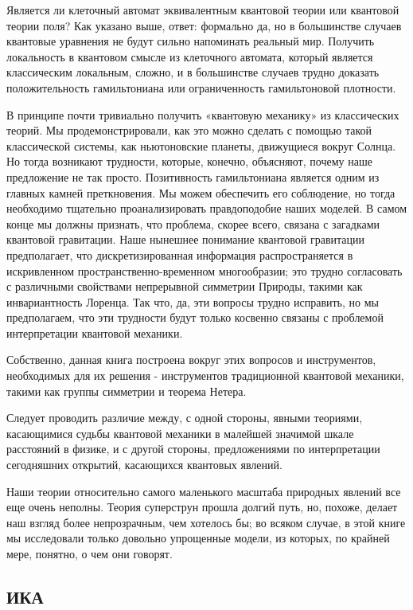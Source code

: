 \documentclass[main.tex]{subfiles}
\begin{document}
Является ли клеточный автомат эквивалентным квантовой теории или квантовой теории поля? Как указано выше, ответ: формально да, но в большинстве случаев квантовые уравнения не будут сильно напоминать реальный мир. Получить локальность в квантовом смысле из клеточного автомата, который является классическим локальным, сложно, и в большинстве случаев трудно доказать положительность гамильтониана или ограниченность гамильтоновой плотности.

В принципе почти тривиально получить «квантовую механику» из классических теорий. Мы продемонстрировали, как это можно сделать с помощью такой классической системы, как ньютоновские планеты, движущиеся вокруг Солнца. Но тогда возникают трудности, которые, конечно, объясняют, почему наше предложение не так просто. Позитивность гамильтониана является одним из главных камней преткновения. Мы можем обеспечить его соблюдение, но тогда необходимо тщательно проанализировать правдоподобие наших моделей. В самом конце мы должны признать, что проблема, скорее всего, связана с загадками квантовой гравитации. Наше нынешнее понимание квантовой гравитации предполагает, что дискретизированная информация распространяется в искривленном пространственно-временном многообразии; это трудно согласовать с различными свойствами непрерывной симметрии Природы, такими как инвариантность Лоренца. Так что, да, эти вопросы трудно исправить, но мы предполагаем, что эти трудности будут только косвенно связаны с проблемой интерпретации квантовой механики.

Собственно, данная книга построена вокруг этих вопросов и инструментов, необходимых для их решения - инструментов  традиционной квантовой механики, такими как группы симметрии и теорема Нетера.

Следует проводить различие между, с одной стороны, явными теориями, касающимися судьбы квантовой механики в малейшей значимой шкале расстояний в физике, и с другой стороны, предложениями по интерпретации сегодняшних открытий, касающихся квантовых явлений.

Наши теории относительно самого маленького масштаба природных явлений все еще очень неполны. Теория суперструн прошла долгий путь, но, похоже, делает наш взгляд более непрозрачным, чем хотелось бы; во всяком случае, в этой книге мы исследовали только довольно упрощенные модели, из которых, по крайней мере, понятно, о чем они говорят.

\subsection{ИКА}\label{ch10.1}
\end{document}
